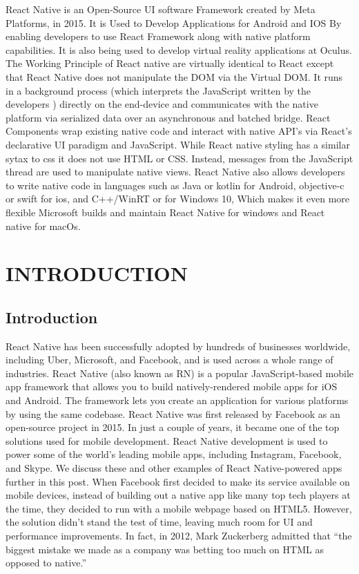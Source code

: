 \documentclass[12pt,a4paper]{report}
\begin{document}
React Native is an Open-Source UI software Framework created by Meta Platforms, in 2015. It is Used to Develop Applications for Android and IOS By enabling developers to use React Framework along with native platform capabilities. It is also being used to develop virtual reality applications at Oculus. The Working Principle of React native are virtually identical to React except that React Native does not manipulate the DOM via the Virtual DOM. It runs in a background process (which  interprets the JavaScript written by the developers ) directly on the end-device and communicates with the native platform via serialized data over an asynchronous and batched bridge. React Components wrap existing native code and interact with native API’s via React’s declarative UI paradigm and JavaScript. While React native styling has a similar sytax to css it does not use HTML or CSS. Instead, messages from the JavaScript thread are used to manipulate native views. React Native also allows developers to write native code in languages such as Java or kotlin for Android, objective-c or swift for ios, and C++/WinRT or  for Windows 10, Which makes it even more flexible Microsoft builds and maintain React Native for windows and React native for macOs.

\newpage

\chapter{INTRODUCTION}
\section{Introduction}

\hspace{0.5cm} React Native has been successfully adopted by hundreds of businesses worldwide, including Uber, Microsoft, and Facebook, and is used across a whole range of industries. React Native (also known as RN) is a popular JavaScript-based mobile app framework that allows you to build natively-rendered mobile apps for iOS and Android. The framework lets you create an application for various platforms by using the same codebase. React Native was first released by Facebook as an open-source project in 2015. In just a couple of years, it became one of the top solutions used for mobile development. React Native development is used to power some of the world’s leading mobile apps, including Instagram, Facebook, and Skype. We discuss these and other examples of React Native-powered apps further in this post. When Facebook first decided to make its service available on mobile devices, instead of building out a native app like many top tech players at the time, they decided to run with a mobile webpage based on HTML5. However, the solution didn’t stand the test of time, leaving much room for UI and performance improvements. In fact, in 2012, Mark Zuckerberg admitted that “the biggest mistake we made as a company was betting too much on HTML as opposed to native.”
\end{document}

